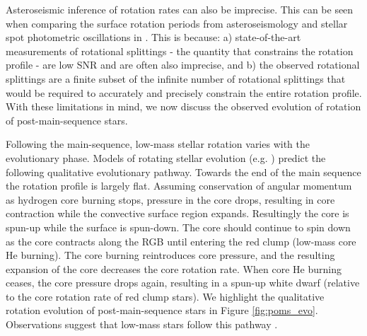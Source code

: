 Asteroseismic inference of rotation rates can also be imprecise.
This can be seen when comparing the surface rotation periods from asteroseismology and stellar spot photometric oscillations in \citet{hall_weakened_2021}.
This is because: a) state-of-the-art measurements of rotational splittings - the quantity that constrains the rotation profile - are low SNR and are often also imprecise, and b) the observed rotational splittings are a finite subset of the infinite number of rotational splittings that would be required to accurately and precisely constrain the entire rotation profile.
With these limitations in mind, we now discuss the observed evolution of rotation of post-main-sequence stars.

Following the main-sequence, low-mass stellar rotation varies with the evolutionary phase.
Models of rotating stellar evolution (e.g. )\citep{maeder_evolution_2000,heger_2000} predict the following qualitative evolutionary pathway.
Towards the end of the main sequence the rotation profile is largely flat.
Assuming conservation of angular momentum as hydrogen core burning stops, pressure in the core drops, resulting in core contraction while the convective surface region expands.
Resultingly the core is spun-up while the surface is spun-down.
The core should continue to spin down as the core contracts along the RGB until entering the red clump (low-mass core He burning).
The core burning reintroduces core pressure, and the resulting expansion of the core decreases the core rotation rate.
When core He burning ceases, the core pressure drops again, resulting in a spun-up white dwarf (relative to the core rotation rate of red clump stars).
We highlight the qualitative rotation evolution of post-main-sequence stars in Figure \ref{fig:poms_evo}.
Observations suggest that low-mass stars follow this pathway \citep{mosser_spin_2012,deheuvels_seismic_2014,deheuvels_seismic_2015,hermes_white_2017,gehan_core_2018,deheuvels_seismic_2020}.

